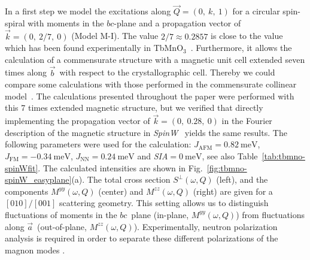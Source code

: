 \documentclass[aps,prb,twocolumn,superscriptaddress,showpacs,floatfix]{revtex4-2}
\newcommand{\tbmno}{TbMnO$_3$}
\newcommand{\spinw}{\textit{SpinW}}
\newcommand{\aaxis}{$\vec{a}$}
\newcommand{\baxis}{$\vec{b}$}
\newcommand{\bcplane}{$bc$}
\begin{document}
In a first step we model the excitations along $\vec{Q}=(0,~k,~1)$ for a circular spin-spiral with moments in the \bcplane-plane and a propagation vector of $\vec{k}=(0,~2/7,~0)$ (Model M-I). The value $2/7\approx0.2857$ is close to the value which has been found experimentally in \tbmno~\cite{Kenzelmann2005,Stein2017}. Furthermore, it allows the calculation of a commensurate structure with a magnetic unit cell extended seven times along \baxis\ with respect to the crystallographic cell. 
Thereby we could compare some calculations with those performed in the commensurate collinear model~\cite{Saenz1962,Ulbrich2012}. The calculations presented throughout the paper were performed
with this 7 times extended magnetic structure, but we verified that directly implementing the propagation vector of $\vec{k}=(0,~0.28,~0)$ in the Fourier description of the magnetic structure in \spinw~\cite{progspinW} yields the same results.
The following parameters were used for the calculation: $J_{\textrm{AFM}}=\SI{0.82}{\meV}$, $J_{\textrm{FM}}=\SI{-0.34}{\meV}$, $J_{\textrm{NN}}=\SI{0.24}{\meV}$ and \textit{SIA}$=\SI{0}{\meV}$, see also Table~\ref{tab:tbmno-spinWfit}. The calculated intensities are shown in Fig.~\ref{fig:tbmno-spinW_easyplane}(a). The total cross section $S^{\perp}(\omega,Q)$ (left), and the components $M^{yy}(\omega,Q)$ (center) and $M^{zz}(\omega,Q)$ (right) are given for a $[010]/[001]$ scattering geometry. This setting allows us to distinguish fluctuations of moments in the \bcplane\ plane (in-plane, $M^{yy}(\omega,Q)$) from fluctuations along \aaxis\ (out-of-plane, $M^{zz}(\omega,Q)$). Experimentally, neutron polarization analysis is required in order to
separate these different polarizations of the magnon modes \cite{Senff2007,Senff2008a}.
\end{document}
